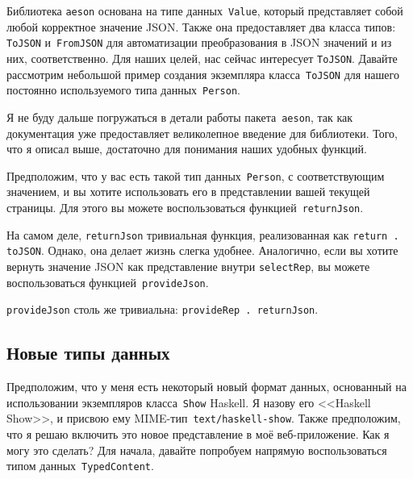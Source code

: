 Библиотека \texttt{aeson} основана на типе данных~\lstinline'Value', который
представляет собой любой корректное значение JSON. Также она предоставляет два
класса типов: \lstinline'ToJSON' и~\lstinline'FromJSON' для автоматизации
преобразования в JSON значений и из них, соответственно. Для наших целей, нас
сейчас интересует \lstinline'ToJSON'. Давайте рассмотрим небольшой пример
создания экземпляра класса~\lstinline'ToJSON' для нашего постоянно
используемого типа данных~\lstinline'Person'.


Я не буду дальше погружаться в детали работы пакета~\texttt{aeson}, так как
 документация
уже предоставляет великолепное введение для библиотеки. Того, что я описал
выше, достаточно для понимания наших удобных функций.

Предположим, что у вас есть такой тип данных~\lstinline'Person', с
соответствующим значением, и вы хотите использовать его в представлении вашей
текущей страницы. Для этого вы можете воспользоваться
функцией~\lstinline'returnJson'.


На самом деле, \lstinline'returnJson' тривиальная функция, реализованная как
\lstinline'return . toJSON'. Однако, она делает жизнь слегка удобнее.
Аналогично, если вы хотите вернуть значение JSON как представление внутри
\lstinline'selectRep', вы можете воспользоваться
функцией~\lstinline'provideJson'.


\lstinline'provideJson' столь же тривиальна:
\lstinline'provideRep . returnJson'.

\subsection{Новые типы данных}
Предположим, что у меня есть некоторый новый формат данных, основанный на
использовании экземпляров класса~\lstinline'Show' Haskell. Я назову его
<<Haskell Show>>, и присвою ему MIME-тип~\texttt{text/haskell-show}. Также
предположим, что я решаю включить это новое представление в моё веб-приложение.
Как я могу это сделать? Для начала, давайте попробуем напрямую воспользоваться
типом данных~\lstinline'TypedContent'.


